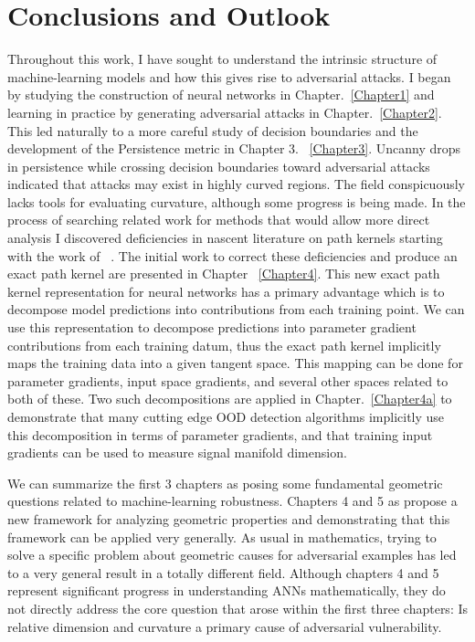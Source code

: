 \chapter{Conclusions and Outlook}

\label{Chapter5} %

Throughout this work, I have sought to understand the intrinsic
structure of machine-learning models and how this gives
rise to adversarial attacks. I began by studying the construction of
neural networks in Chapter.~\ref{Chapter1} and learning in practice by generating adversarial
attacks in Chapter.~\ref{Chapter2}. This led naturally to a more careful study of decision
boundaries and the development of the Persistence metric in Chapter
3. ~\ref{Chapter3}. Uncanny drops in persistence while crossing
decision boundaries toward adversarial attacks indicated that attacks
may exist in highly curved regions. The field conspicuously lacks
tools for evaluating curvature, although some progress is being
made. In the process of searching related work for methods that would allow more
direct analysis I discovered deficiencies in nascent literature on
path kernels starting with the work of ~\citet{domingos2020}. The
initial work to correct these deficiencies and produce an exact path
kernel are presented in Chapter ~\ref{Chapter4}. This new exact path kernel
representation for neural networks has a primary advantage which is to
decompose model predictions into contributions from each training
point. We can use this representation to decompose predictions into
parameter gradient contributions from each training datum, thus the exact path kernel implicitly maps the
training data into a given tangent space. This mapping can be done for
parameter gradients, input space gradients, and several other
spaces related to both of these. Two such decompositions are applied
in Chapter.~\ref{Chapter4a} to demonstrate that many cutting edge OOD
detection algorithms implicitly use this decomposition in terms of
parameter gradients, and that training input gradients can be
used to measure signal manifold dimension.

We can summarize the first 3 chapters as posing some fundamental
geometric questions related to machine-learning robustness. 
Chapters 4 and 5 as propose a new framework for analyzing geometric
properties and demonstrating that this framework can be applied very
generally. As usual in mathematics, trying to solve a specific problem
about geometric causes for adversarial examples has led to a very
general result in a totally different field. Although chapters 4 and 5
represent significant progress in understanding ANNs mathematically,
they do not directly address the core question that arose within the
first three chapters: Is relative dimension and curvature a primary
cause of adversarial vulnerability. 

